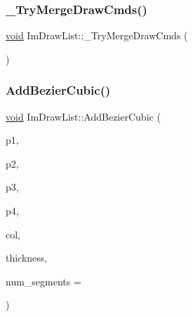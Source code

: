 \mbox{\label{structImDrawList_abdba85bbdc26a98eac56ed04683d5fc7}} 
\subsubsection{\texorpdfstring{\+\_\+\+Try\+Merge\+Draw\+Cmds()}{\_TryMergeDrawCmds()}}
{\footnotesize\ttfamily \hyperlink{imgui__impl__opengl3__loader_8h_ac668e7cffd9e2e9cfee428b9b2f34fa7}{void} Im\+Draw\+List\+::\+\_\+\+Try\+Merge\+Draw\+Cmds (\begin{DoxyParamCaption}{ }\end{DoxyParamCaption})}

\mbox{\label{structImDrawList_a90ebb3c38b997ef3a3adb4d211a1b2a8}} 
\subsubsection{\texorpdfstring{Add\+Bezier\+Cubic()}{AddBezierCubic()}}
{\footnotesize\ttfamily \hyperlink{imgui__impl__opengl3__loader_8h_ac668e7cffd9e2e9cfee428b9b2f34fa7}{void} Im\+Draw\+List\+::\+Add\+Bezier\+Cubic (\begin{DoxyParamCaption}\item[{const \hyperlink{structImVec2}{Im\+Vec2} \&}]{p1,  }\item[{const \hyperlink{structImVec2}{Im\+Vec2} \&}]{p2,  }\item[{const \hyperlink{structImVec2}{Im\+Vec2} \&}]{p3,  }\item[{const \hyperlink{structImVec2}{Im\+Vec2} \&}]{p4,  }\item[{Im\+U32}]{col,  }\item[{float}]{thickness,  }\item[{int}]{num\+\_\+segments = {} }\end{DoxyParamCaption})}

\mbox{\label{structImDrawList_ab815c52f29fa5579bad8142ae2e89ced}} 
